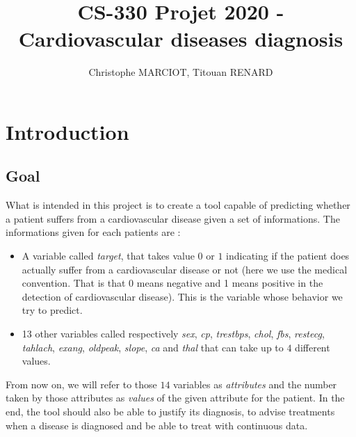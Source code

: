 \documentclass[french]{article}
\title{CS-330 Projet 2020 - Cardiovascular diseases diagnosis}   %
\author{Christophe MARCIOT, Titouan RENARD}         %
\begin{document}
\maketitle

\section{Introduction}

\subsection{Goal}

What is intended in this project is to create a tool capable of predicting whether a patient suffers from a cardiovascular disease given a set of informations.
The informations given for each patients are :
	\begin{itemize}
		\item A variable called \emph{target}, that takes value $0$ or $1$ indicating if the patient does actually suffer from a cardiovascular disease or not (here we use the medical convention. That is that 0 means negative and 1 means positive in the detection of cardiovascular disease). This is the variable whose behavior we try to predict.
		\item 13 other variables called respectively \emph{sex}, \emph{cp}, \emph{trestbps}, \emph{chol}, \emph{fbs}, \emph{restecg}, \emph{tahlach}, \emph {exang}, \emph{oldpeak}, \emph{slope}, \emph{ca} and \emph{thal} that can take up to $4$ different values.
	\end{itemize}
From now on, we will refer to those $14$  variables as \emph{attributes} and the number taken by those attributes as \emph{values} of the given attribute for the patient. In the end, the tool should also be able to justify its diagnosis, to advise treatments when a disease is diagnosed and be able to treat with continuous data. %
\end{document}

